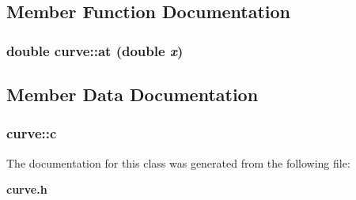\subsection{Member Function Documentation}
\subsubsection[{at}]{\setlength{\rightskip}{0pt plus 5cm}double curve::at (double {\em x})}\label{classcurve_2ad58e80af6548e79bea3730bde63a87}




\subsection{Member Data Documentation}
\subsubsection[{c}]{ {\bf curve::c}}\label{classcurve_c8b844e574ba2f04db2fdd3cc22748fb}




The documentation for this class was generated from the following file:\begin{CompactItemize}
\item 
{\bf curve.h}\end{CompactItemize}

